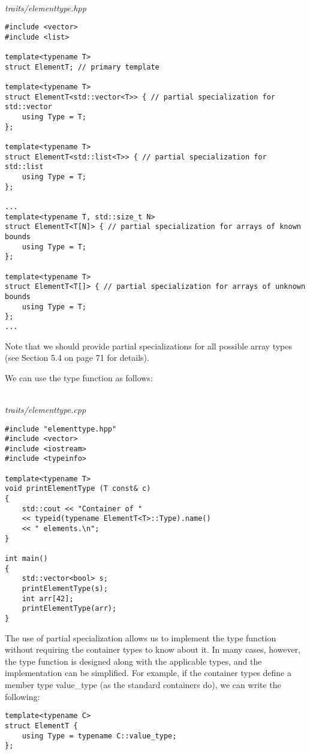 \hspace*{\fill} \\ %
\noindent
\textit{traits/elementtype.hpp}
\begin{lstlisting}[style=styleCXX]
#include <vector>
#include <list>

template<typename T>
struct ElementT; // primary template

template<typename T>
struct ElementT<std::vector<T>> { // partial specialization for std::vector
	using Type = T;
};

template<typename T>
struct ElementT<std::list<T>> { // partial specialization for std::list
	using Type = T;
};

...
template<typename T, std::size_t N>
struct ElementT<T[N]> { // partial specialization for arrays of known bounds
	using Type = T;
};

template<typename T>
struct ElementT<T[]> { // partial specialization for arrays of unknown bounds
	using Type = T;
};
...
\end{lstlisting}

Note that we should provide partial specializations for all possible array types (see Section 5.4 on page 71 for details).

We can use the type function as follows:

\hspace*{\fill} \\ %
\noindent
\textit{traits/elementtype.cpp}
\begin{lstlisting}[style=styleCXX]
#include "elementtype.hpp"
#include <vector>
#include <iostream>
#include <typeinfo>

template<typename T>
void printElementType (T const& c)
{
	std::cout << "Container of "
	<< typeid(typename ElementT<T>::Type).name()
	<< " elements.\n";
}

int main()
{
	std::vector<bool> s;
	printElementType(s);
	int arr[42];
	printElementType(arr);
}
\end{lstlisting}

The use of partial specialization allows us to implement the type function without requiring the container types to know about it. In many cases, however, the type function is designed along with the applicable types, and the implementation can be simplified. For example, if the container types define a member type value\_type (as the standard containers do), we can write the following:

\begin{lstlisting}[style=styleCXX]
template<typename C>
struct ElementT {
	using Type = typename C::value_type;
};
\end{lstlisting}

